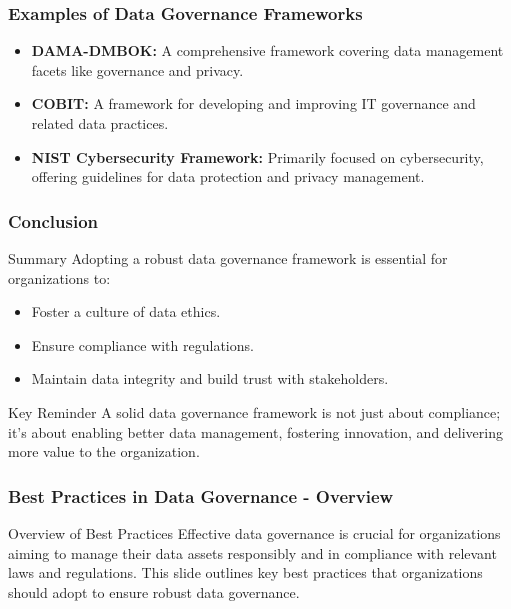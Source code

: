 \documentclass{beamer}
\begin{document}
\begin{frame}[fragile]
    \frametitle{Examples of Data Governance Frameworks}
    \begin{itemize}
        \item \textbf{DAMA-DMBOK:} A comprehensive framework covering data management facets like governance and privacy.
        \item \textbf{COBIT:} A framework for developing and improving IT governance and related data practices.
        \item \textbf{NIST Cybersecurity Framework:} Primarily focused on cybersecurity, offering guidelines for data protection and privacy management.
    \end{itemize}
\end{frame}

\begin{frame}[fragile]
    \frametitle{Conclusion}
    \begin{block}{Summary}
        Adopting a robust data governance framework is essential for organizations to:
        \begin{itemize}
            \item Foster a culture of data ethics.
            \item Ensure compliance with regulations.
            \item Maintain data integrity and build trust with stakeholders.
        \end{itemize}
    \end{block}

    \begin{block}{Key Reminder}
        A solid data governance framework is not just about compliance; it’s about enabling better data management, fostering innovation, and delivering more value to the organization.
    \end{block}
\end{frame}

\begin{frame}[fragile]
    \frametitle{Best Practices in Data Governance - Overview}
    \begin{block}{Overview of Best Practices}
        Effective data governance is crucial for organizations aiming to manage their data assets responsibly and in compliance with relevant laws and regulations. This slide outlines key best practices that organizations should adopt to ensure robust data governance.
    \end{block}
\end{frame}
\end{document}
